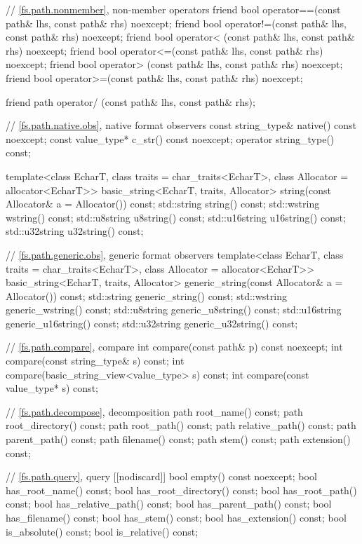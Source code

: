 \begin{codeblock}
{{    // \ref{fs.path.nonmember}, non-member operators
    friend bool operator==(const path& lhs, const path& rhs) noexcept;
    friend bool operator!=(const path& lhs, const path& rhs) noexcept;
    friend bool operator< (const path& lhs, const path& rhs) noexcept;
    friend bool operator<=(const path& lhs, const path& rhs) noexcept;
    friend bool operator> (const path& lhs, const path& rhs) noexcept;
    friend bool operator>=(const path& lhs, const path& rhs) noexcept;

    friend path operator/ (const path& lhs, const path& rhs);

    // \ref{fs.path.native.obs}, native format observers
    const string_type& native() const noexcept;
    const value_type*  c_str() const noexcept;
    operator string_type() const;

    template<class EcharT, class traits = char_traits<EcharT>,
             class Allocator = allocator<EcharT>>
      basic_string<EcharT, traits, Allocator>
        string(const Allocator& a = Allocator()) const;
    std::string    string() const;
    std::wstring   wstring() const;
    std::u8string  u8string() const;
    std::u16string u16string() const;
    std::u32string u32string() const;

    // \ref{fs.path.generic.obs}, generic format observers
    template<class EcharT, class traits = char_traits<EcharT>,
             class Allocator = allocator<EcharT>>
      basic_string<EcharT, traits, Allocator>
        generic_string(const Allocator& a = Allocator()) const;
    std::string    generic_string() const;
    std::wstring   generic_wstring() const;
    std::u8string  generic_u8string() const;
    std::u16string generic_u16string() const;
    std::u32string generic_u32string() const;

    // \ref{fs.path.compare}, compare
    int compare(const path& p) const noexcept;
    int compare(const string_type& s) const;
    int compare(basic_string_view<value_type> s) const;
    int compare(const value_type* s) const;

    // \ref{fs.path.decompose}, decomposition
    path root_name() const;
    path root_directory() const;
    path root_path() const;
    path relative_path() const;
    path parent_path() const;
    path filename() const;
    path stem() const;
    path extension() const;

    // \ref{fs.path.query}, query
    [[nodiscard]] bool empty() const noexcept;
    bool has_root_name() const;
    bool has_root_directory() const;
    bool has_root_path() const;
    bool has_relative_path() const;
    bool has_parent_path() const;
    bool has_filename() const;
    bool has_stem() const;
    bool has_extension() const;
    bool is_absolute() const;
    bool is_relative() const;

}}
\end{codeblock}

